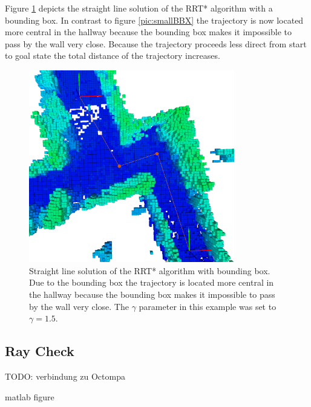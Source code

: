 Figure \ref{pic:bbx} depicts the straight line solution of the RRT* algorithm with a bounding box. In contrast to figure \ref{pic:smallBBX} the trajectory is now located more central in the hallway because the bounding box makes it impossible to pass by the wall very close. Because the trajectory proceeds less direct from start to goal state the total distance of the trajectory increases. 

\begin{figure}[H]
   \centering
   \includegraphics[trim = 50mm 0mm 30mm 0mm,clip,width=0.8\textwidth]{pics/largeBBXP.png}
   \caption{Straight line solution of the RRT* algorithm with bounding box. Due to the bounding box the trajectory is located more central in the hallway because the bounding box makes it impossible to pass by the wall very close. The $\gamma$ parameter in this example was set to $\gamma = 1.5$.}
   \label{pic:bbx}
\end{figure}

\subsection{Ray Check}

 TODO: verbindung zu Octompa
 
 matlab figure






